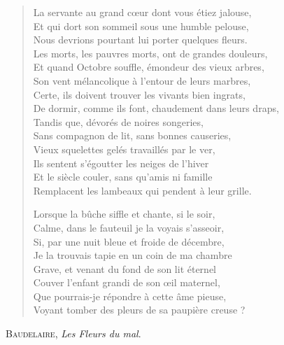 \documentclass[fontsize=14pt,DIV=calc,a4paper,french]{scrartcl}
\begin{document}
\settowidth{\versewidth}{La servante au grand cœur dont vous étiez jalouse,}

\begin{verse}
La servante au grand cœur dont vous étiez jalouse,\\
Et qui dort son sommeil sous une humble pelouse,\\
Nous devrions pourtant lui porter quelques fleurs.\\
Les morts, les pauvres morts, ont de grandes douleurs,\\
Et quand Octobre souffle, émondeur des vieux arbres,\\
Son vent mélancolique à l’entour de leurs marbres,\\
Certe, ils doivent trouver les vivants bien ingrats,\\
De dormir, comme ils font, chaudement dans leurs draps,\\
Tandis que, dévorés de noires songeries,\\
Sans compagnon de lit, sans bonnes causeries,\\
Vieux squelettes gelés travaillés par le ver,\\
Ils sentent s’égoutter les neiges de l’hiver\\
Et le siècle couler, sans qu’amis ni famille\\
Remplacent les lambeaux qui pendent à leur grille.

Lorsque la bûche siffle et chante, si le soir,\\
Calme, dans le fauteuil je la voyais s’asseoir,\\
Si, par une nuit bleue et froide de décembre,\\
Je la trouvais tapie en un coin de ma chambre\\
Grave, et venant du fond de son lit éternel\\
Couver l’enfant grandi de son œil maternel,\\
Que pourrais-je répondre à cette âme pieuse,\\
Voyant tomber des pleurs de sa paupière creuse ?
\end{verse}

\begin{flushright}
\large
\textsc{Baudelaire}, \textit{Les Fleurs du mal}.
\end{flushright}
\end{document}
